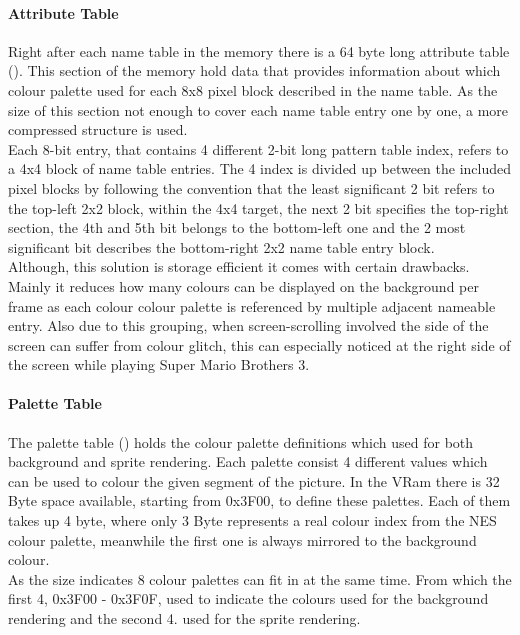 \documentclass[]{report}
\begin{document}
\paragraph{Attribute Table}
Right after each name table in the memory there is a 64 byte long attribute table (\cite{ATRT}). This section of the memory hold data that provides information about which colour palette used for each 8x8 pixel block described in the name table. As the size of this section not enough to cover each name table entry one by one, a more compressed structure is used.
\\
Each 8-bit entry, that contains 4 different 2-bit long pattern table index, refers to a 4x4 block of name table entries. The 4 index is divided up between the included pixel blocks by following the convention that the least significant 2 bit refers to the top-left 2x2 block, within the 4x4 target, the next 2 bit specifies the top-right section, the 4th and 5th bit belongs to the bottom-left one and the 2 most significant bit describes the bottom-right 2x2 name table entry block.
\\
Although, this solution is storage efficient it comes with certain drawbacks. Mainly it reduces how many colours can be displayed on the background per frame as each colour colour palette is referenced by multiple adjacent nameable entry. Also due to this grouping, when screen-scrolling involved the side of the screen can suffer from colour glitch, this can especially noticed at the right side of the screen while playing Super Mario Brothers 3.

\paragraph{Palette Table}
The palette table (\cite{PLTT}) holds the colour palette definitions which used for both background and sprite rendering. Each palette consist 4 different values which can be used to colour the given segment of the picture. In the VRam there is 32 Byte space available, starting from 0x3F00, to define these palettes. Each of them takes up 4 byte, where only 3 Byte represents a real colour index from the NES colour palette, meanwhile the first one is always mirrored to the background colour. 
\\
As the size indicates 8 colour palettes can fit in at the same time. From which the first 4, 0x3F00 - 0x3F0F, used to indicate the colours used for the background rendering and the second 4. used for the sprite rendering.
\end{document}
